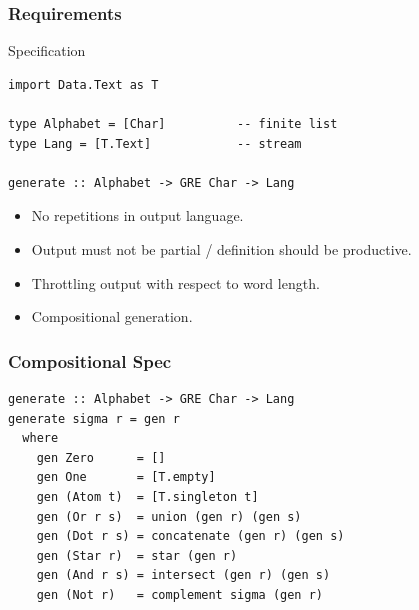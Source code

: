 \documentclass[pdftex,aspectratio=169]{beamer}
\begin{document}
\begin{frame}[fragile]
  \frametitle{Requirements}
  \vspace{-\baselineskip}
  \begin{block}{Specification}
\begin{lstlisting}[numbers=none]
import Data.Text as T

type Alphabet = [Char]          -- finite list
type Lang = [T.Text]            -- stream

generate :: Alphabet -> GRE Char -> Lang
\end{lstlisting}
  \end{block}
  \begin{itemize}
  \item No repetitions in output language.
  \item Output must not be partial / definition should be productive.
  \item Throttling output with respect to word length.
  \item Compositional generation.
  \end{itemize}
\end{frame}
\begin{frame}[fragile]
  \frametitle{Compositional Spec}
\begin{lstlisting}[numbers=none]
generate :: Alphabet -> GRE Char -> Lang
generate sigma r = gen r
  where
    gen Zero      = []
    gen One       = [T.empty]
    gen (Atom t)  = [T.singleton t]
    gen (Or r s)  = union (gen r) (gen s)
    gen (Dot r s) = concatenate (gen r) (gen s)
    gen (Star r)  = star (gen r)
    gen (And r s) = intersect (gen r) (gen s)
    gen (Not r)   = complement sigma (gen r)
\end{lstlisting}
\end{frame}




\end{document}
